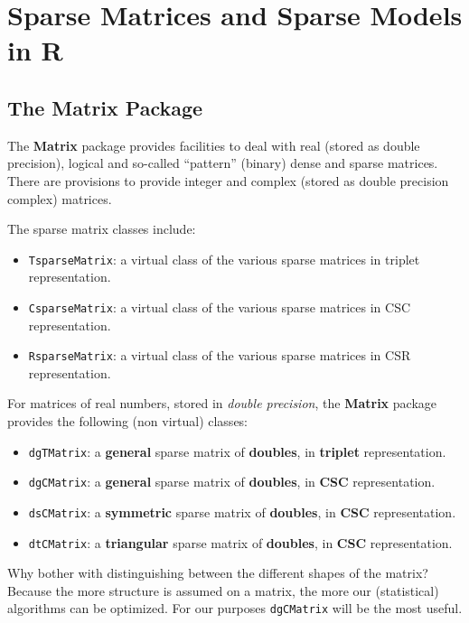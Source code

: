 \documentclass[]{book}
\providecommand{\tightlist}{%
  \setlength{\itemsep}{0pt}\setlength{\parskip}{0pt}}
\theoremstyle{definition}
\theoremstyle{definition}
\theoremstyle{definition}
\theoremstyle{remark}
\begin{document}
\hypertarget{sparse-matrices-and-sparse-models-in-r}{%
\section{Sparse Matrices and Sparse Models in R}\label{sparse-matrices-and-sparse-models-in-r}}

\hypertarget{the-matrix-package}{%
\subsection{The Matrix Package}\label{the-matrix-package}}

The \textbf{Matrix} package provides facilities to deal with real (stored as double precision), logical and so-called ``pattern'' (binary) dense and sparse matrices.
There are provisions to provide integer and complex (stored as double precision complex) matrices.

The sparse matrix classes include:

\begin{itemize}
\tightlist
\item
  \texttt{TsparseMatrix}: a virtual class of the various sparse matrices in triplet representation.
\item
  \texttt{CsparseMatrix}: a virtual class of the various sparse matrices in CSC representation.
\item
  \texttt{RsparseMatrix}: a virtual class of the various sparse matrices in CSR representation.
\end{itemize}

For matrices of real numbers, stored in \emph{double precision}, the \textbf{Matrix} package provides the following (non virtual) classes:

\begin{itemize}
\tightlist
\item
  \texttt{dgTMatrix}: a \textbf{general} sparse matrix of \textbf{doubles}, in \textbf{triplet} representation.
\item
  \texttt{dgCMatrix}: a \textbf{general} sparse matrix of \textbf{doubles}, in \textbf{CSC} representation.
\item
  \texttt{dsCMatrix}: a \textbf{symmetric} sparse matrix of \textbf{doubles}, in \textbf{CSC} representation.
\item
  \texttt{dtCMatrix}: a \textbf{triangular} sparse matrix of \textbf{doubles}, in \textbf{CSC} representation.
\end{itemize}

Why bother with distinguishing between the different shapes of the matrix?
Because the more structure is assumed on a matrix, the more our (statistical) algorithms can be optimized.
For our purposes \texttt{dgCMatrix} will be the most useful.
\end{document}
